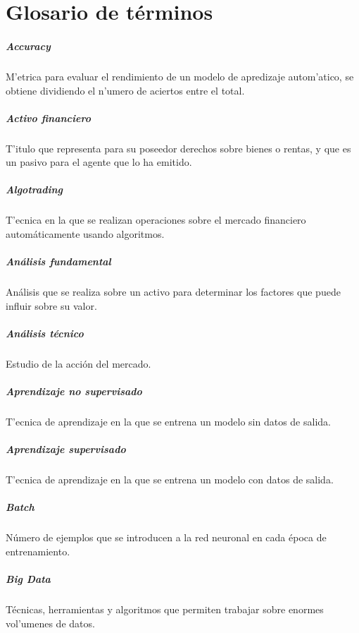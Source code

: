 \chapter*{Glosario de términos}
 
\paragraph*{Accuracy} M'etrica para evaluar el rendimiento de un modelo de apredizaje autom'atico, se obtiene dividiendo el n'umero de aciertos entre el total.
\paragraph*{Activo financiero} T'itulo que representa para su poseedor derechos sobre bienes o rentas, y que es un pasivo para el agente que lo ha emitido.
\paragraph*{Algotrading} T'ecnica en la que se realizan operaciones sobre el mercado financiero automáticamente usando algoritmos.
\paragraph*{Análisis fundamental} Análisis que se realiza sobre un activo para determinar los factores que puede influir sobre su valor.
\paragraph*{Análisis técnico} Estudio de la acción del mercado.
\paragraph*{Aprendizaje no supervisado} T'ecnica de aprendizaje en la que se entrena un modelo sin datos de salida.
\paragraph*{Aprendizaje supervisado} T'ecnica de aprendizaje en la que se entrena un modelo con datos de salida.
\paragraph*{Batch} Número de ejemplos que se introducen a la red neuronal en cada época de entrenamiento.
\paragraph*{Big Data} Técnicas, herramientas y algoritmos que permiten trabajar sobre enormes vol'umenes de datos.
